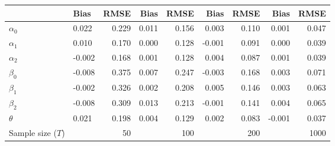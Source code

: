 
\begin{tabular}[t]{llrrrrrrr}
\toprule
  & Bias & RMSE & Bias & RMSE & Bias & RMSE & Bias & RMSE\\
\midrule
$\alpha_{0}$ & 0.022 & 0.229 & 0.011 & 0.156 & 0.003 & 0.110 & 0.001 & 0.047\\
$\alpha_{1}$ & 0.010 & 0.170 & 0.000 & 0.128 & -0.001 & 0.091 & 0.000 & 0.039\\
$\alpha_{2}$ & -0.002 & 0.168 & 0.001 & 0.128 & 0.004 & 0.087 & 0.001 & 0.039\\
$\beta_{0}$ & -0.008 & 0.375 & 0.007 & 0.247 & -0.003 & 0.168 & 0.003 & 0.071\\
$\beta_{1}$ & -0.002 & 0.326 & 0.002 & 0.208 & 0.005 & 0.146 & 0.003 & 0.063\\
$\beta_{2}$ & -0.008 & 0.309 & 0.013 & 0.213 & -0.001 & 0.141 & 0.004 & 0.065\\
$\theta$ & 0.021 & 0.198 & 0.004 & 0.129 & 0.002 & 0.083 & -0.001 & 0.037\\
Sample size ($T$) &  & 50 &  & 100 &  & 200 &  & 1000\\
\bottomrule
\end{tabular}
